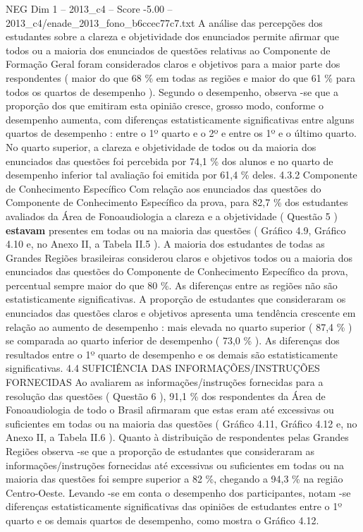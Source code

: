 \begin{textsample}{NEG Dim 1 – 2013\_c4 – Score -5.00 – 2013\_c4/enade\_2013\_fono\_b6ccec77c7.txt}
A análise das percepções dos estudantes sobre a clareza e objetividade dos enunciados permite afirmar que todos ou a maioria dos enunciados de questões relativas ao Componente de Formação Geral foram considerados claros e objetivos para a maior parte dos respondentes ( maior do que 68 \% em todas as regiões e maior do que 61 \% para todos os quartos de desempenho ).
Segundo o desempenho, observa -se que a proporção dos que emitiram esta opinião cresce, grosso modo, conforme o desempenho aumenta, com diferenças estatisticamente significativas entre alguns quartos de desempenho : entre o 1º quarto e o 2º e entre os 1º e o último quarto.
No quarto superior, a clareza e objetividade de todos ou da maioria dos enunciados das questões foi percebida por 74,1 \% dos alunos e no quarto de desempenho inferior tal avaliação foi emitida por 61,4 \% deles. 4.3.2 Componente de Conhecimento Específico Com relação aos enunciados das questões do Componente de Conhecimento Específico da prova, para 82,7 \% dos estudantes avaliados da Área de Fonoaudiologia a clareza e a objetividade ( Questão 5 ) \textbf{estavam} presentes em todas ou na maioria das questões ( Gráfico 4.9, Gráfico 4.10 e, no Anexo II, a Tabela II.5 ).
A maioria dos estudantes de todas as Grandes Regiões brasileiras considerou claros e objetivos todos ou a maioria dos enunciados das questões do Componente de Conhecimento Específico da prova, percentual sempre maior do que 80 \%.
As diferenças entre as regiões não são estatisticamente significativas.
A proporção de estudantes que consideraram os enunciados das questões claros e objetivos apresenta uma tendência crescente em relação ao aumento de desempenho : mais elevada no quarto superior ( 87,4 \% ) se comparada ao quarto inferior de desempenho ( 73,0 \% ).
As diferenças dos resultados entre o 1º quarto de desempenho e os demais são estatisticamente significativas. 4.4 SUFICIÊNCIA DAS INFORMAÇÕES/INSTRUÇÕES FORNECIDAS Ao avaliarem as informações/instruções fornecidas para a resolução das questões ( Questão 6 ), 91,1 \% dos respondentes da Área de Fonoaudiologia de todo o Brasil afirmaram que estas eram até excessivas ou suficientes em todas ou na maioria das questões ( Gráfico 4.11, Gráfico 4.12 e, no Anexo II, a Tabela II.6 ).
Quanto à distribuição de respondentes pelas Grandes Regiões observa -se que a proporção de estudantes que consideraram as informações/instruções fornecidas até excessivas ou suficientes em todas ou na maioria das questões foi sempre superior a 82 \%, chegando a 94,3 \% na região Centro-Oeste.
Levando -se em conta o desempenho dos participantes, notam -se diferenças estatisticamente significativas das opiniões de estudantes entre o 1º quarto e os demais quartos de desempenho, como mostra o Gráfico 4.12.

\end{textsample}
